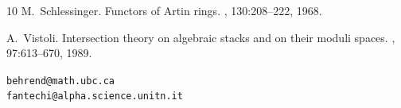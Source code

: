 \documentclass[11pt]{article}
\theoremstyle{plain}
\theoremstyle{definition}
\theoremstyle{plain}
\theoremstyle{definition}
\theoremstyle{remark}
\begin{document}
\begin{thebibliography}{10}
M.~Schlessinger.
\newblock Functors of Artin rings.
, 130:208--222, 1968.

A.~Vistoli.
\newblock Intersection theory on algebraic stacks and on their moduli spaces.
, 97:613--670, 1989.


\end{thebibliography}

\begin{flushleft}
{\tt behrend@math.ubc.ca}\\
{\tt fantechi@alpha.science.unitn.it}
\end{flushleft}
\end{document}
